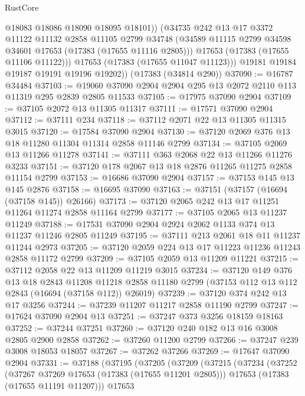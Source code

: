 \begin{lexlean}{RustCore}
\begin{coremodule}
              @18083
              @18086
              @18090
              @18095
              @18101))
          (@34735
            @242
            @13
            @17
            @3372
            @11122
            @11132
            @2858
            @11105
            @2799
            @34748
            (@34589 @11115 @2799 @34598 @34601 @17653 (@17383 (@17655 @11116 @2805)))
            @17653
            (@17383 (@17655 @11106 @11122)))
          @17653
          (@17383 (@17655 @11047 @11123)))
        @19181
        @19184
        @19187
        @19191
        @19196
        @19202))
    (@17383 (@34814 @290))
@37090 := @16787 @34484
@37103 := @19060 @37090 @2904 @2904 @295 @13 @2072 @2110 @113 @11319 @295 @2839 @2805 @11533
@37105 := @17975 @37090 @2904
@37109 := @37105 @2072 @13 @11305 @11317
@37111 := @17571 @37090 @2904
@37112 := @37111 @234
@37118 := @37112 @2071 @22 @13 @11305 @11315 @3015
@37120 := @17584 @37090 @2904
@37130 := @37120 @2069 @376 @13 @18 @11280 @11304 @11314 @2858 @11146 @2799
@37134 := @37105 @2069 @13 @11266 @11278
@37141 := @37111 @363 @2068 @22 @13 @11266 @11276 @3233
@37151 := @37120 @178 @2067 @13 @18 @2876 @11265 @11275 @2858 @11154 @2799
@37153 := @16686 @37090 @2904
@37157 := @37153 @145 @13 @145 @2876
@37158 := @16695 @37090
@37163 := @37151 (@37157 (@16694 (@37158 @145)) @26166)
@37173 := @37120 @2065 @242 @13 @17 @11251 @11264 @11274 @2858 @11164 @2799
@37177 := @37105 @2065 @13 @11237 @11249
@37188 := @17531 @37090 @2904 @2924 @2062 @1133 @374 @13 @11237 @11246 @2805 @11249
@37195 := @37111 @213 @2061 @18 @11 @11237 @11244 @2973
@37205 := @37120 @2059 @224 @13 @17 @11223 @11236 @11243 @2858 @11172 @2799
@37209 := @37105 @2059 @13 @11209 @11221
@37215 := @37112 @2058 @22 @13 @11209 @11219 @3015
@37234 := @37120
    @149
    @376
    @13
    @18
    @2843
    @11208
    @11218
    @2858
    @11180
    @2799
    (@37153 @112 @13 @112 @2843 (@16694 (@37158 @112)) @26019)
@37239 := @37120 @374 @242 @13 @17 @3256
@37244 := @37239 @11207 @11217 @2858 @11190 @2799
@37247 := @17624 @37090 @2904 @13
@37251 := @37247 @373 @3256 @18159 @18163
@37252 := @37244 @37251
@37260 := @37120 @240 @182 @13 @16 @3008 @2805 @2900 @2858
@37262 := @37260 @11200 @2799
@37266 := @37247 @239 @3008 @18053 @18057
@37267 := @37262 @37266
@37269 := @17647 @37090 @2904
@37331 := @37188
    (@37195
      (@37205
        (@37209
          (@37215
            (@37234
              (@37252
                (@37267 @37269 @17653 (@17383 (@17655 @11201 @2805)))
                @17653
                (@17383 (@17655 @11191 @11207)))
              @17653

\end{coremodule}
\end{lexlean}
